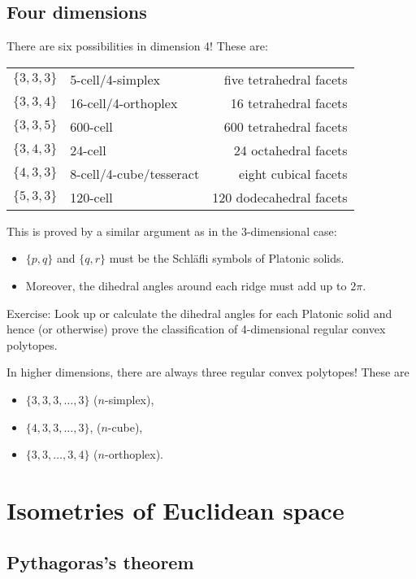 \documentclass[12pt]{article}
\begin{document}
\subsection{Four dimensions}

There are six possibilities in dimension 4! These are:

\begin{tabular}{c|lr}
  $\{3,3,3\}$ & 5-cell/4-simplex & five tetrahedral facets\\
  $\{3,3,4\}$ & 16-cell/4-orthoplex & 16 tetrahedral facets\\
  $\{3,3,5\}$ & 600-cell & 600 tetrahedral facets\\
  $\{3,4,3\}$ & 24-cell & 24 octahedral facets\\
  $\{4,3,3\}$ & 8-cell/4-cube/tesseract & eight cubical facets\\
  $\{5,3,3\}$ & 120-cell & 120 dodecahedral facets
\end{tabular}

This is proved by a similar argument as in the 3-dimensional case:
\begin{itemize}
\item $\{p,q\}$ and $\{q,r\}$ must be the Schl\"afli symbols of Platonic solids.
\item Moreover, the dihedral angles around each ridge must add up to $2\pi$.
\end{itemize}
Exercise: Look up or calculate the dihedral angles for each Platonic solid and hence (or otherwise) prove the classification of 4-dimensional regular convex polytopes.

In higher dimensions, there are always three regular convex polytopes! These are
\begin{itemize}
\item $\{3,3,3,\ldots,3\}$ ($n$-simplex),
\item $\{4,3,3,\ldots,3\}$, ($n$-cube),
\item $\{3,3,\ldots,3,4\}$ ($n$-orthoplex).
\end{itemize}

\newpage


\section{Isometries of Euclidean space}

\subsection{Pythagoras's theorem}
\end{document}
